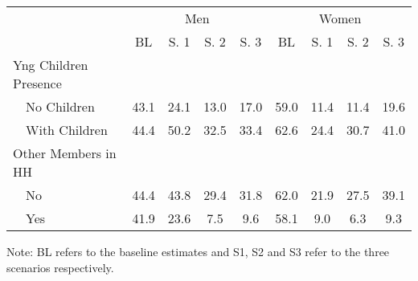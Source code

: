 \begin{tabular}{l*{8}{c}}
\hline\hline
          & \multicolumn{4}{c}{Men} & \multicolumn{4}{c}{Women} \\  \cline{2-5} \cline{6-9}
            &    BL&  S. 1&  S. 2&  S. 3&    BL&  S. 1&  S. 2&  S. 3\\
Yng Children Presence & \multicolumn{8}{c}{} \\ 
\ \ No Children&        43.1&        24.1&        13.0&        17.0&        59.0&        11.4&        11.4&        19.6\\
\ \ With Children&        44.4&        50.2&        32.5&        33.4&        62.6&        24.4&        30.7&        41.0\\
\midrule

Other Members in HH    & \multicolumn{8}{c}{} \\ 
\ \ No      &        44.4&        43.8&        29.4&        31.8&        62.0&        21.9&        27.5&        39.1\\
\ \ Yes     &        41.9&        23.6&         7.5&         9.6&        58.1&         9.0&         6.3&         9.3\\
\hline\hline
\end{tabular}
\footnotesize Note: BL refers to the baseline estimates and S1, S2 and S3 refer to the three scenarios respectively.

